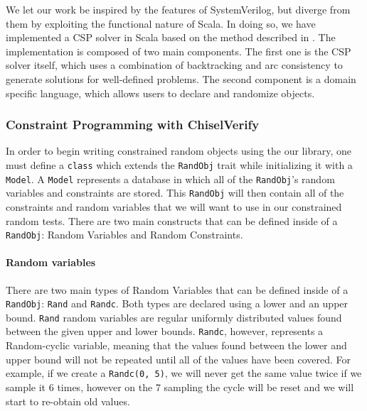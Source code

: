 \documentclass[conference]{IEEEtran}
\newcommand{\code}[1]{{\small{\texttt{#1}}}}
\begin{document}

We let our work be inspired by the features of SystemVerilog, but diverge from them by exploiting the functional nature of Scala. In doing so, we have implemented a CSP solver in Scala based on the method described in \cite{russell2002artificial}. The implementation is composed of two main components. The first one is the CSP solver itself, which uses a combination of backtracking and arc consistency to generate solutions for well-defined problems. The second component is a domain specific language, which allows users to declare and randomize objects.

\subsubsection{Constraint Programming with ChiselVerify}
In order to begin writing constrained random objects using the our library, one must define a \texttt{class} which extends the \texttt{RandObj} trait while initializing it with a \texttt{Model}. A \texttt{Model} represents a database in which all of the \texttt{RandObj}'s random variables and constraints are stored. This \texttt{RandObj} will then contain all of the constraints and random variables that we will want to use in our constrained random tests. There are two main constructs that can be defined inside of a \texttt{RandObj}: Random Variables and Random Constraints.

\paragraph{Random variables} There are two main types of Random Variables that can be defined inside of a \texttt{RandObj}: \texttt{Rand} and \texttt{Randc}. Both types are declared using a lower and an upper bound. \texttt{Rand} random variables  are regular uniformly distributed values found between the given upper and lower bounds. \texttt{Randc}, however, represents a Random-cyclic variable, meaning that the values found between the lower and upper bound will not be repeated until all of the values have been covered. For example, if we create a \texttt{Randc(0, 5)}, we will never get the same value twice if we sample it 6 times, however on the 7 sampling the cycle will be reset and we will start to re-obtain old values.
\end{document}
